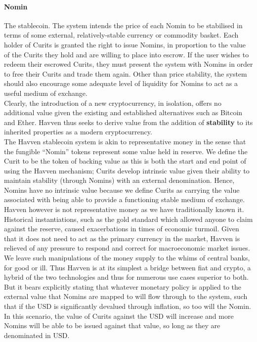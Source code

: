 \paragraph{Nomin} The stablecoin. The system intends the price of each Nomin to be stabilised in terms of some external, relatively-stable currency or commodity basket. Each holder of Curits is granted the right to issue Nomins, in proportion to the value of the Curits they hold and are willing to place into escrow. If the user wishes to redeem their escrowed Curits, they must present the system with Nomins in order to free their Curits and trade them again. Other than price stability, the system should also encourage some adequate level of liquidity for Nomins to act as a useful medium of exchange. \\

\noindent Clearly, the introduction of a new cryptocurrency, in isolation, offers no additional value given the existing and established alternatives such as Bitcoin and Ether. Havven thus seeks to derive value from the addition of \textbf{stability} to its inherited properties as a modern cryptocurrency. \\

\noindent The Havven stablecoin system is akin to representative money in the sense that the fungible ``Nomin'' tokens represent some value held in reserve. We define the Curit to be the token of backing value as this is both the start and end point of using the Havven mechanism; Curits develop intrinsic value given their ability to maintain stability (through Nomins) with an external denomination. Hence, Nomins have no intrinsic value because we define Curits as carrying the value associated with being able to provide a functioning stable medium of exchange. \\

\noindent Havven however is not representative money as we have traditionally known it. Historical instantiations, such as the gold standard which allowed anyone to claim against the reserve, caused exacerbations in times of economic turmoil. Given that it does not need to act as the primary currency in the market, Havven is relieved of any pressure to respond and correct for macroeconomic market issues. We leave such manipulations of the money supply to the whims of central banks, for good or ill. Thus Havven is at its simplest a bridge between fiat and crypto, a hybrid of the two technologies and thus for numerous use cases superior to both. But it bears explicitly stating that whatever monetary policy is applied to the external value that Nomins are mapped to will flow through to the system, such that if the USD is significantly devalued through inflation, so too will the Nomin. In this scenario, the value of Curits against the USD will increase and more Nomins will be able to be issued against that value, so long as they are denominated in USD. \\

